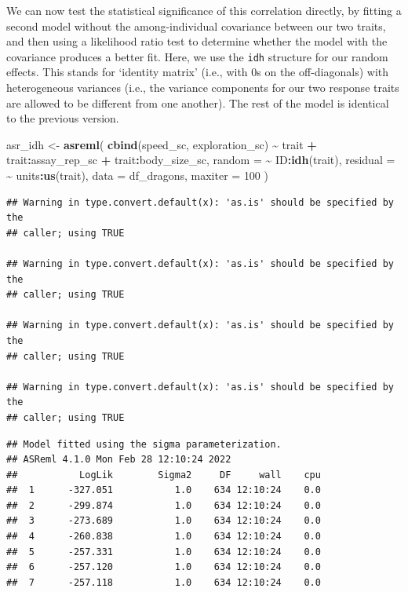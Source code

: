 \documentclass[
  12pt,
]{book}
\newenvironment{Shaded}{\begin{snugshade}}{\end{snugshade}}
\newcommand{\DataTypeTok}[1]{\textcolor[rgb]{0.13,0.29,0.53}{#1}}
\newcommand{\DecValTok}[1]{\textcolor[rgb]{0.00,0.00,0.81}{#1}}
\newcommand{\KeywordTok}[1]{\textcolor[rgb]{0.13,0.29,0.53}{\textbf{#1}}}
\newcommand{\NormalTok}[1]{#1}
\newcommand{\OperatorTok}[1]{\textcolor[rgb]{0.81,0.36,0.00}{\textbf{#1}}}
\newcommand{\StringTok}[1]{\textcolor[rgb]{0.31,0.60,0.02}{#1}}
\begin{document}
We can now test the statistical significance of this correlation directly, by fitting a second model without the among-individual covariance between our two traits, and then using a likelihood ratio test to determine whether the model with the covariance produces a better fit.
Here, we use the \texttt{idh} structure for our random effects. This stands for `identity matrix' (i.e., with 0s on the off-diagonals) with heterogeneous variances (i.e., the variance components for our two response traits are allowed to be different from one another).
The rest of the model is identical to the previous version.

\begin{Shaded}
\begin{Highlighting}[]
\NormalTok{asr\_idh \textless{}{-}}\StringTok{ }\KeywordTok{asreml}\NormalTok{(}
    \KeywordTok{cbind}\NormalTok{(speed\_sc, exploration\_sc) }\OperatorTok{\textasciitilde{}}\StringTok{ }\NormalTok{trait }\OperatorTok{+}
\StringTok{    }\NormalTok{trait}\OperatorTok{:}\NormalTok{assay\_rep\_sc }\OperatorTok{+}\StringTok{ }\NormalTok{trait}\OperatorTok{:}\NormalTok{body\_size\_sc,}
  \DataTypeTok{random =} \OperatorTok{\textasciitilde{}}\StringTok{ }\NormalTok{ID}\OperatorTok{:}\KeywordTok{idh}\NormalTok{(trait),}
  \DataTypeTok{residual =} \OperatorTok{\textasciitilde{}}\StringTok{ }\NormalTok{units}\OperatorTok{:}\KeywordTok{us}\NormalTok{(trait),}
  \DataTypeTok{data =}\NormalTok{ df\_dragons,}
  \DataTypeTok{maxiter =} \DecValTok{100}
\NormalTok{)}
\end{Highlighting}
\end{Shaded}

\begin{verbatim}
## Warning in type.convert.default(x): 'as.is' should be specified by the
## caller; using TRUE

## Warning in type.convert.default(x): 'as.is' should be specified by the
## caller; using TRUE

## Warning in type.convert.default(x): 'as.is' should be specified by the
## caller; using TRUE

## Warning in type.convert.default(x): 'as.is' should be specified by the
## caller; using TRUE
\end{verbatim}

\begin{verbatim}
## Model fitted using the sigma parameterization.
## ASReml 4.1.0 Mon Feb 28 12:10:24 2022
##           LogLik        Sigma2     DF     wall    cpu
##  1      -327.051           1.0    634 12:10:24    0.0
##  2      -299.874           1.0    634 12:10:24    0.0
##  3      -273.689           1.0    634 12:10:24    0.0
##  4      -260.838           1.0    634 12:10:24    0.0
##  5      -257.331           1.0    634 12:10:24    0.0
##  6      -257.120           1.0    634 12:10:24    0.0
##  7      -257.118           1.0    634 12:10:24    0.0
\end{verbatim}
\end{document}
